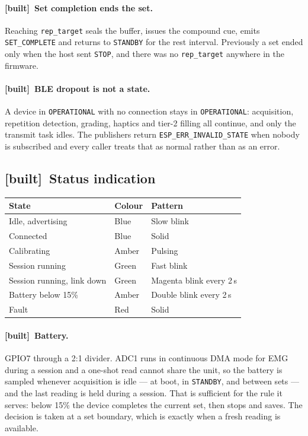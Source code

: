 \documentclass[11pt]{article}
\newcommand{\built}{{\sffamily\scriptsize\color{good}\textbf{[built]}}\ }
\begin{document}
\paragraph{\built Set completion ends the set.} Reaching \texttt{rep\_target}
seals the buffer, issues the compound cue, emits \texttt{SET\_COMPLETE} and
returns to \texttt{STANDBY} for the rest interval. Previously a set ended only
when the host sent \texttt{STOP}, and there was no \texttt{rep\_target}
anywhere in the firmware.

\paragraph{\built BLE dropout is not a state.} A device in
\texttt{OPERATIONAL} with no connection stays in \texttt{OPERATIONAL}:
acquisition, repetition detection, grading, haptics and tier-2 filling all
continue, and only the transmit task idles. The publishers return
\texttt{ESP\_ERR\_INVALID\_STATE} when nobody is subscribed and every caller
treats that as normal rather than as an error.

\subsection{\built Status indication}

\begin{table}[H]
\centering\small
\begin{tabularx}{\linewidth}{@{}p{40mm} p{26mm} X@{}}
\toprule
\textbf{State} & \textbf{Colour} & \textbf{Pattern} \\
\midrule
Idle, advertising & Blue & Slow blink \\
Connected & Blue & Solid \\
Calibrating & Amber & Pulsing \\
Session running & Green & Fast blink \\
Session running, link down & Green & Magenta blink every 2\,s \\
Battery below 15\% & Amber & Double blink every 2\,s \\
Fault & Red & Solid \\
\bottomrule
\end{tabularx}
\end{table}

\paragraph{\built Battery.} GPIO7 through a 2:1 divider. ADC1 runs in
continuous DMA mode for EMG during a session and a one-shot read cannot share
the unit, so the battery is sampled whenever acquisition is idle --- at boot,
in \texttt{STANDBY}, and between sets --- and the last reading is held during
a session. That is sufficient for the rule it serves: below 15\% the device
completes the current set, then stops and saves. The decision is taken at a
set boundary, which is exactly when a fresh reading is available.
\end{document}
